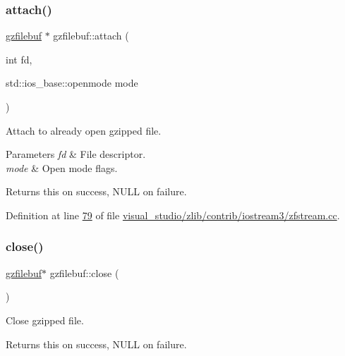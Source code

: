 \subsubsection{\texorpdfstring{attach()}{attach()}\hspace{0.1cm}{\footnotesize\ttfamily [2/2]}}
{\footnotesize\ttfamily \hyperlink{classgzfilebuf}{gzfilebuf} $\ast$ gzfilebuf\+::attach (\begin{DoxyParamCaption}\item[{int}]{fd,  }\item[{std\+::ios\+\_\+base\+::openmode}]{mode }\end{DoxyParamCaption})}



Attach to already open gzipped file. 


\begin{DoxyParams}{Parameters}
{\em fd} & File descriptor. \\
\hline
{\em mode} & Open mode flags. \\
\hline
\end{DoxyParams}
\begin{DoxyReturn}{Returns}
{\ttfamily this} on success, N\+U\+LL on failure. 
\end{DoxyReturn}


Definition at line \hyperlink{visual__studio_2zlib_2contrib_2iostream3_2zfstream_8cc_source_l00079}{79} of file \hyperlink{visual__studio_2zlib_2contrib_2iostream3_2zfstream_8cc_source}{visual\+\_\+studio/zlib/contrib/iostream3/zfstream.\+cc}.

\mbox{\label{classgzfilebuf_a280d1c661fb371c22de1214d5a1682a2}} 
\subsubsection{\texorpdfstring{close()}{close()}\hspace{0.1cm}{\footnotesize\ttfamily [1/2]}}
{\footnotesize\ttfamily \hyperlink{classgzfilebuf}{gzfilebuf}$\ast$ gzfilebuf\+::close (\begin{DoxyParamCaption}{ }\end{DoxyParamCaption})}



Close gzipped file. 

\begin{DoxyReturn}{Returns}
{\ttfamily this} on success, N\+U\+LL on failure. 
\end{DoxyReturn}
\mbox{\label{classgzfilebuf_a280d1c661fb371c22de1214d5a1682a2}} 
